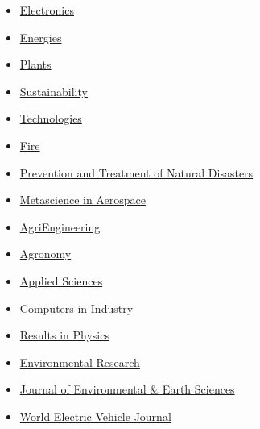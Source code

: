 \begin{itemize}
    \item[$\blacktriangleright$] \href{https://www.mdpi.com/journal/electronics/}%
    {Electronics}

    \item[$\blacktriangleright$] \href{https://www.mdpi.com/journal/energies/}%
    {Energies}

    \item[$\blacktriangleright$] \href{https://www.mdpi.com/journal/plants/}%
    {Plants}

    \item[$\blacktriangleright$] \href{https://www.mdpi.com/journal/sustainability/}%
    {Sustainability}

    \item[$\blacktriangleright$] \href{https://www.mdpi.com/journal/technologies/}%
    {Technologies}

    \item[$\blacktriangleright$] \href{https://www.mdpi.com/journal/fire/}%
    {Fire}

    \item[$\blacktriangleright$] \href{https://ojs.ukscip.com/index.php/ptnd/}%
    {Prevention and Treatment of Natural Disasters}

    \item[$\blacktriangleright$] \href{https://www.aimspress.com/journal/mina/}%
    {Metascience in Aerospace}

    \item[$\blacktriangleright$] \href{https://www.mdpi.com/journal/agriengineering/}%
    {AgriEngineering}
    
    \item[$\blacktriangleright$] \href{https://www.mdpi.com/journal/agronomy/}%
    {Agronomy}

    \item[$\blacktriangleright$] \href{https://www.mdpi.com/journal/applsci/}%
    {Applied Sciences}
    
    \item[$\blacktriangleright$] \href{https://www.sciencedirect.com/journal/computers-in-industry/}%
    {Computers in Industry}

    \item[$\blacktriangleright$] \href{https://www.sciencedirect.com/journal/results-in-physics/}%
    {Results in Physics}

    \item[$\blacktriangleright$] \href{https://www.sciencedirect.com/journal/environmental-research/ }%
    {Environmental Research}
    
    \item[$\blacktriangleright$] \href{https://journals.bilpubgroup.com/index.php/jees/}%
    {Journal of Environmental \& Earth Sciences}

    \item[$\blacktriangleright$] \href{https://www.mdpi.com/journal/wevj/}%
    {World Electric Vehicle Journal}
    
\end{itemize}

